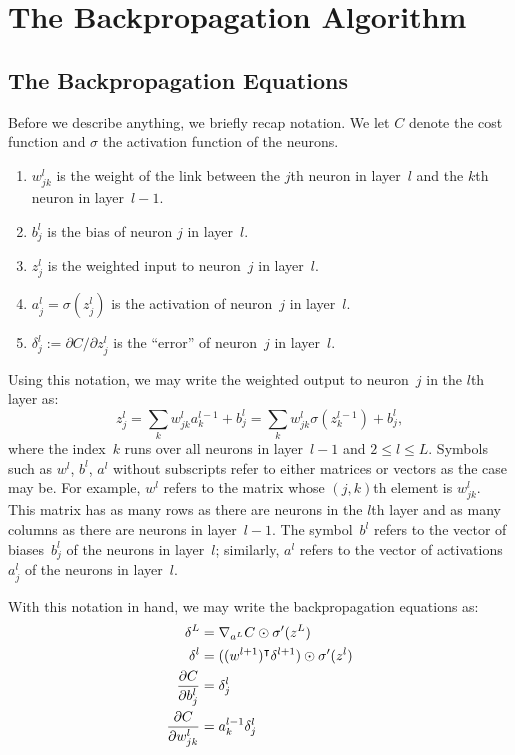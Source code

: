 \chapter{The Backpropagation Algorithm}

\section{The Backpropagation Equations}

Before we describe anything, we briefly recap notation. We let 
$C$ denote the cost function and $\sigma$ the activation function 
of the neurons. 
\begin{enumerate}
    \item $w_{j k}^{l}$ is the weight of the link between the $j$th
        neuron in layer~$l$ and the $k$th neuron in layer~$l - 1$.
    \item $b_j^l$ is the bias of neuron $j$ in layer~$l$.
    \item $z_{j}^l$ is the weighted input to neuron~$j$ in layer~$l$.
    \item $a_j^{l} = \sigma(z_{j}^l)$ is the activation of neuron~$j$ in 
        layer~$l$.
    \item $\delta_{j}^{l} := \partial C / \partial z_{j}^{l}$ is 
        the ``error'' of neuron~$j$ in layer~$l$.
\end{enumerate}

Using this notation, we may write the weighted output to neuron~$j$
in the $l$th layer as:
\[
    z_{j}^{l} = \sum_{k} w_{j k}^l a_{k}^{l - 1} + b_{j}^l = 
                \sum_{k} w_{j k}^l \sigma (z_{k}^{l - 1}) + b_{j}^l, 
\]
where the index~$k$ runs over all neurons in layer~$l - 1$ and 
$2 \leq l \leq L$. Symbols such as $w^{l}$, $b^{l}$, $a^{l}$ without 
subscripts refer to either matrices or vectors as the case may be. 
For example, $w^{l}$ refers to the matrix whose $(j, k)$th element 
is $w_{j k}^{l}$. This matrix has as many rows as there are neurons
in the $l$th layer and as many columns as there are neurons in 
layer~$l - 1$. The symbol~$b^{l}$ refers to the vector of 
biases~$b_{j}^l$ of the neurons in layer~$l$; similarly, $a^{l}$ 
refers to the vector of activations~$a_{j}^l$ of the neurons in 
layer~$l$.

With this notation in hand, we may write the backpropagation equations
as:
\begin{align}
\setlength{\jot}{12pt}
    \delta^{L} & = \nabla_{a^L} C \odot \sigma'(z^L) \\
    \delta^{l} & = ( \trans{(w^{l + 1})} \delta^{l + 1} ) \odot \sigma'(z^l) \\
    \frac{\partial C}{\partial b_j^{l}} & = \delta_{j}^l \\
    \frac{\partial C}{\partial w_{j k}^l} & = a_{k}^{l - 1} \delta_{j}^l
\end{align}
